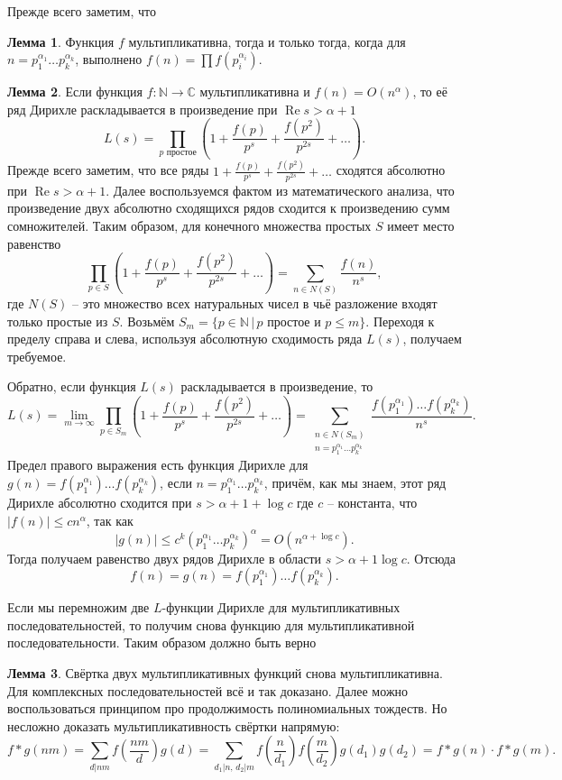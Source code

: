 \documentclass[10pt,a4paper,oneside]{book}
\theoremstyle{definition}
\newtheorem{lem}{{\color{green!50!black} Лемма}}
\renewcommand{\Re}{\operatorname{Re}}
\newcommand{\mb}[1]{\mathbb{#1}}
\def\lm{\begin{lem}}
\def\elm{\end{lem}}
\begin{document}
Прежде всего заметим, что 
\lm Функция $f$ мультипликативна, тогда и только тогда, когда для $n=p_1^{\alpha_1}\dots p_k^{\alpha_k}$, выполнено $f(n)=\prod f(p_i^{\alpha_i})$.
\elm

\lm Если функция $f\colon \mb N \to \mb C$ мультипликативна и $f(n)=O(n^{\alpha})$, то её ряд Дирихле раскладывается в произведение при $\Re s > \alpha+1$
$$L(s)=\prod_{p \text{ простое}} \left(1+\frac{f(p)}{p^s}+\frac{f(p^2)}{p^{2s}}+\dots\right).$$
\proof Прежде всего заметим, что все ряды $1+\frac{f(p)}{p^s}+\frac{f(p^2)}{p^{2s}}+\dots$ сходятся абсолютно при $\Re s>\alpha+1$. Далее воспользуемся фактом из математического анализа, что произведение двух абсолютно сходящихся рядов сходится к произведению сумм сомножителей. Таким образом, для конечного множества простых $S$ имеет место равенство
$$\prod_{p \in S } \left(1+\frac{f(p)}{p^s}+\frac{f(p^2)}{p^{2s}}+\dots\right)=\sum_{n\in N(S)} \frac{f
(n)}{n^s},$$
где $N(S)$ -- это множество всех натуральных чисел в чьё разложение входят только простые из $S$. Возьмём $S_m=\{p\in \mb N \,|\, p \text{ простое и } p\leq m\}$. Переходя к пределу справа и слева, используя абсолютную сходимость ряда $L(s)$, получаем требуемое.

Обратно, если функция $L(s)$ раскладывается в произведение, то 
$$L(s)=\lim_{m\to \infty} \prod_{p \in S_m } \left(1+\frac{f(p)}{p^s}+\frac{f(p^2)}{p^{2s}}+\dots\right)=\sum_{\substack{ n\in N(S_m) \\ n=p_1^{\alpha_1}\dots p_k^{\alpha_k}}}\!\! \frac{f(p_1^{\alpha_1})\dots f(p_k^{\alpha_k})}{n^s}.$$
Предел правого выражения есть функция Дирихле для $g(n)=f(p_1^{\alpha_1})\dots f(p_k^{\alpha_k})$, если $n=p_1^{\alpha_1}\dots p_k^{\alpha_k}$, причём, как мы знаем, этот ряд Дирихле абсолютно сходится при $s>\alpha +1+\log c$ где $c$ -- константа, что $|f(n)|\leq c n^{\alpha}$, так как 
$$|g(n)|\leq c^k(p_1^{\alpha_1}\dots p_k^{\alpha_k})^{\alpha}=O(n^{\alpha+\log c}).$$
Тогда получаем равенство двух рядов Дирихле в области $s>\alpha+1\log c$. Отсюда $$f(n)=g(n)=f(p_1^{\alpha_1})\dots f(p_k^{\alpha_k}).$$
\endproof
\elm

Если мы перемножим две $L$-функции Дирихле для мультипликативных последовательностей, то получим снова функцию для мультипликативной последовательности. Таким образом должно быть верно

\lm Свёртка двух мультипликативных функций снова мультипликативна.
\proof Для комплексных последовательностей всё и так доказано. Далее можно воспользоваться принципом про продолжимость полиномиальных тождеств. Но несложно доказать мультипликативность свёртки напрямую:
$$f*g(nm)=\sum_{d|nm} f\left(\frac{nm}{d}\right)g(d) = \sum_{d_1 |n, \, d_2|m}f\left(\frac{n}{d_1}\right)f\left(\frac{m}{d_2}\right)g(d_1)g(d_2)= f*g(n)\cdot f*g(m).$$ 
\endproof
\elm
\end{document}
